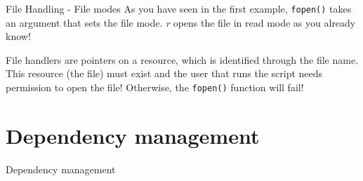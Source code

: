 \begin{frame}[fragile]{File Handling - File modes}
	As you have seen in the first example, \texttt{fopen()} takes an argument that sets the file mode. \textit{r} opens the file in read mode as you already know!\pause
	
	File handlers are pointers on a resource, which is identified through the file name. This resource (the file) must exist and the user that runs the script needs permission to open the file! Otherwise, the \texttt{fopen()} function will fail!\pause
	
	
\end{frame}

\section{Dependency management}

\begin{frame}[fragile]{Dependency management}
\end{frame}



